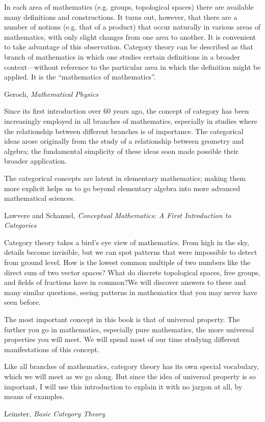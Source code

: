 \documentclass[11pt]{book}
\begin{document}
\pagebreak
\epigraph{In each area of mathematics 
(e.g. groups, topological spaces) 
there are available many definitions and constructions.
It turns out, however, that there are a number of notions
(e.g. that of a product) that occur naturally 
in various areas of mathematics, with only slight changes from
one area to another.
It is convenient to take advantage of this observation.
Category theory can be described as that branch of mathematics
in which one studies certain definitions in a broader context---without
reference to the particular area 
in which the definition might be applied.
It is the ``mathematics of mathematics''.}
{Geroch, \textit{Mathematical Physics}~\cite{geroch_1985}}

\epigraph{Since its first introduction over 60 years ago, the concept of category has been
increasingly employed in all branches of mathematics, especially in studies where the
relationship between different branches is of importance. The categorical ideas arose
originally from the study of a relationship between geometry and algebra; the
fundamental simplicity of these ideas soon made possible their broader application.
\par
The categorical concepts are latent in elementary mathematics; making them more
explicit helps us to go beyond elementary algebra into more advanced mathematical
sciences.}
{Lawvere and Schanuel, 
\textit{Conceptual Mathematics: 
A First Introduction to Categories}~\cite{lawvere_schanuel_2009_conceptual_math}}

\pagebreak
\epigraph{Category theory takes a bird’s eye view of mathematics. From high in the sky,
details become invisible, but we can spot patterns that were impossible to detect
from ground level. How is the lowest common multiple of two numbers
like the direct sum of two vector spaces? What do discrete topological spaces,
free groups, and fields of fractions have in common?We will discover answers
to these and many similar questions, seeing patterns in mathematics that you
may never have seen before.
\par
The most important concept in this book is that of universal property. The
further you go in mathematics, especially pure mathematics, the more universal
properties you will meet. We will spend most of our time studying different
manifestations of this concept.
\par
Like all branches of mathematics, category theory has its own special vocabulary,
which we will meet as we go along. But since the idea of universal
property is so important, I will use this introduction to explain it with no jargon
at all, by means of examples.}
{Leinster, \textit{Basic Category Theory}~\cite{leinster_2016_basic_category_theory}}
\end{document}
